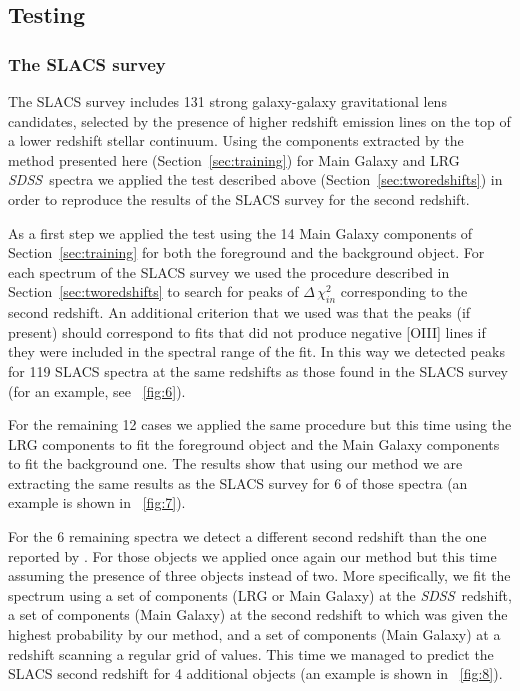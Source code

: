 \documentclass[12pt,preprint]{aastex}
\newcommand{\project}[1]{\textsl{#1}}
\newcommand{\sdss}{\project{SDSS}}
\newcommand{\SDSS}{\sdss}
\newcommand{\sectionname}{Section}
\begin{document}
\subsection{Testing}

\subsubsection{The SLACS survey}
The SLACS survey \citep{bolton} includes 131 strong galaxy-galaxy
gravitational lens candidates, selected by the presence of higher
redshift emission lines on the top of a lower redshift stellar continuum. 
Using the components extracted by the method presented here
(\sectionname~\ref{sec:training}) for Main Galaxy and LRG \SDSS\ spectra
we applied the test described above
(\sectionname~\ref{sec:tworedshifts}) in order to reproduce the results of the
SLACS survey for the second redshift.

As a first step we applied the test using the 14 Main Galaxy components of
\sectionname~\ref{sec:training} for both the foreground and the
background object. For each spectrum of the SLACS survey we used 
the procedure described in \sectionname~\ref{sec:tworedshifts} to
search for peaks of $\Delta\,\chi_{in}^2$ corresponding to the second redshift. 
An additional criterion that we used was that the peaks (if present) should 
correspond to fits that did not produce negative [OIII] lines if they were 
included in the spectral range of the fit. In this way we detected peaks for 119 SLACS 
spectra at the same redshifts as those found in the SLACS survey 
(for an example, see \figurename~\ref{fig:6}).

For the remaining 12 cases we applied the same procedure but this
time using the LRG components to fit the foreground object and the
Main Galaxy components to fit the background one. The results show that
using our method we are extracting the same results as the SLACS
survey for 6 of those spectra (an example is shown in \figurename~\ref{fig:7}).

For the 6 remaining spectra we detect a different second redshift than
the one reported by \cite{bolton}. For those objects we applied once
again our method but this time assuming the presence of three objects
instead of two. More specifically, we fit the spectrum using a set of
components (LRG or Main Galaxy) at the \SDSS\ redshift, a set of components
(Main Galaxy) at the second redshift to which was given the highest
probability by our method, and a set of components (Main Galaxy)
at a redshift scanning a regular grid of values. This time we managed
to predict the SLACS second redshift for 4 additional objects
(an example is shown in \figurename~\ref{fig:8}).
\end{document}
